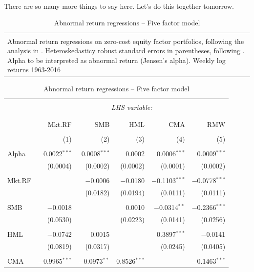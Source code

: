 There are so many more things to say here. Let's do this together tomorrow.

\begin{table}[!htbp] \centering 
  \caption{Abnormal return regressions -- Five factor model} 
  \label{fig:abnormal_five} 
\begin{tabularx}{\textwidth}{X}
\\[-1.8ex]\toprule
\\[-1.8ex] 
\footnotesize Abnormal return regressions on zero-cost equity factor portfolios, following the analysis in \textcite{FF2015}. Heteroskedasticy robust standard errors in parentheses, following \textcite{White1982}. Alpha to be interpreted as abnormal return (Jensen's alpha). Weekly log returns 1963-2016
\end{tabularx}
\begin{tabularx}{\textwidth}{@{\extracolsep{5pt}}X rrrrr} 
\\[-1.8ex]\midrule 
\\[-1.8ex] 
  & \multicolumn{5}{c}{\textit{LHS variable:}} \\ 
\cline{2-6} 
\\[-1.8ex] & \multicolumn{5}{c}{ } \\ 
 & Mkt.RF & SMB & HML & CMA & RMW \\ 
\\[-1.8ex] & (1) & (2) & (3) & (4) & (5)\\ 
\hline \\[-1.8ex] 
 Alpha & 0.0022$^{***}$ & 0.0008$^{***}$ & 0.0002 & 0.0006$^{***}$ & 0.0009$^{***}$ \\ 
  & (0.0004) & (0.0002) & (0.0002) & (0.0001) & (0.0002) \\ 
  & & & & & \\ 
 Mkt.RF &  & $-$0.0006 & $-$0.0180 & $-$0.1103$^{***}$ & $-$0.0778$^{***}$ \\ 
  &  & (0.0182) & (0.0194) & (0.0111) & (0.0111) \\ 
  & & & & & \\ 
 SMB & $-$0.0018 &  & 0.0010 & $-$0.0314$^{**}$ & $-$0.2366$^{***}$ \\ 
  & (0.0530) &  & (0.0223) & (0.0141) & (0.0256) \\ 
  & & & & & \\ 
 HML & $-$0.0742 & 0.0015 &  & 0.3897$^{***}$ & $-$0.0141 \\ 
  & (0.0819) & (0.0317) &  & (0.0245) & (0.0405) \\ 
  & & & & & \\ 
 CMA & $-$0.9965$^{***}$ & $-$0.0973$^{**}$ & 0.8526$^{***}$ &  & $-$0.1463$^{***}$ \\ 

\end{tabularx}
\end{table}
